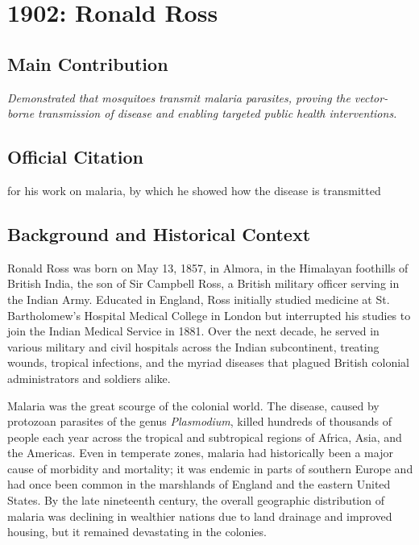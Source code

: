 \chapter[1902 --- Ross]{1902: Ronald Ross}
\label{ch:1902_ronaldross}

\section*{Main Contribution}

\textit{Demonstrated that mosquitoes transmit malaria parasites, proving the vector-borne transmission of disease and enabling targeted public health interventions.}\cite{nobel-1902,lecture-1902}

\section{Official Citation}

for his work on malaria, by which he showed how the disease is transmitted

\section{Background and Historical Context}

Ronald Ross was born on May 13, 1857, in Almora, in the Himalayan foothills of British India, the son of Sir Campbell Ross, a British military officer serving in the Indian Army. Educated in England, Ross initially studied medicine at St. Bartholomew's Hospital Medical College in London but interrupted his studies to join the Indian Medical Service in 1881. Over the next decade, he served in various military and civil hospitals across the Indian subcontinent, treating wounds, tropical infections, and the myriad diseases that plagued British colonial administrators and soldiers alike.

Malaria was the great scourge of the colonial world. The disease, caused by protozoan parasites of the genus \emph{Plasmodium}, killed hundreds of thousands of people each year across the tropical and subtropical regions of Africa, Asia, and the Americas. Even in temperate zones, malaria had historically been a major cause of morbidity and mortality; it was endemic in parts of southern Europe and had once been common in the marshlands of England and the eastern United States. By the late nineteenth century, the overall geographic distribution of malaria was declining in wealthier nations due to land drainage and improved housing, but it remained devastating in the colonies.

